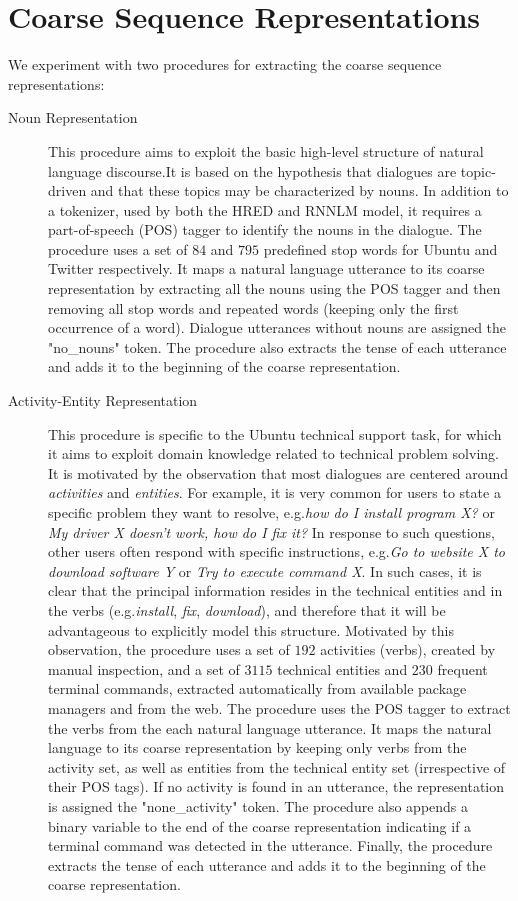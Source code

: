 \documentclass{article}
\begin{document}
 
\section{Coarse Sequence Representations} \label{seq:coarse_seq_rep}
We experiment with two procedures for extracting the coarse sequence representations:

\begin{description}
\item [Noun Representation] This procedure aims to exploit the basic high-level structure of natural language discourse.It is based on the hypothesis that dialogues are topic-driven and that these topics may be characterized by nouns.
In addition to a tokenizer, used by both the HRED and RNNLM model, it requires a part-of-speech (POS) tagger to identify the nouns in the dialogue.
The procedure uses a set of $84$ and $795$ predefined stop words for Ubuntu and Twitter respectively.
It maps a natural language utterance to its coarse representation by extracting all the nouns using the POS tagger and then removing all stop words and repeated words (keeping only the first occurrence of a word). Dialogue utterances without nouns are assigned the "no\_nouns" token. The procedure also extracts the tense of each utterance and adds it to the beginning of the coarse representation.
\item [Activity-Entity Representation] This procedure is specific to the Ubuntu technical support task, for which it aims to exploit domain knowledge related to technical problem solving. It is motivated by the observation that most dialogues are centered around \textit{activities} and \textit{entities}. For example, it is very common for users to state a specific problem they want to resolve, e.g.\@ \textit{how do I install program X?} or \textit{My driver X doesn't work, how do I fix it?}
In response to such questions, other users often respond with specific instructions, e.g.\@ \textit{Go to website X to download software Y} or \textit{Try to execute command X}.
In such cases, it is clear that the principal information resides in the technical entities and in the verbs (e.g.\@ \textit{install}, \textit{fix}, \textit{download}), and therefore that it will be advantageous to explicitly model this structure.
Motivated by this observation, the procedure uses a set of $192$ activities (verbs), created by manual inspection, and a set of $3115$ technical entities and $230$ frequent terminal commands, extracted automatically from available package managers and from the web.
The procedure uses the POS tagger to extract the verbs from the each natural language utterance.
It maps the natural language to its coarse representation by keeping only verbs from the activity set, as well as entities from the technical entity set (irrespective of their POS tags).
If no activity is found in an utterance, the representation is assigned the "none\_activity" token.
The procedure also appends a binary variable to the end of the coarse representation indicating if a terminal command was detected in the utterance.
Finally, the procedure extracts the tense of each utterance and adds it to the beginning of the coarse representation.
\end{description}
\end{document}
